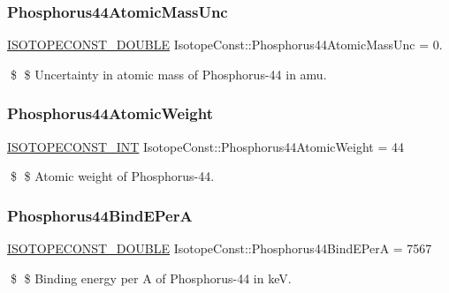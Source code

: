 \subsubsection{\texorpdfstring{Phosphorus44\+Atomic\+Mass\+Unc}{Phosphorus44AtomicMassUnc}}
{\footnotesize\ttfamily \mbox{\hyperlink{group___isotope_const-_macros_ga8f45a7272ce02c0b4c65c44636ed719a}{I\+S\+O\+T\+O\+P\+E\+C\+O\+N\+S\+T\+\_\+\+D\+O\+U\+B\+LE}} Isotope\+Const\+::\+Phosphorus44\+Atomic\+Mass\+Unc = 0.}

\$ \$ Uncertainty in atomic mass of Phosphorus-\/44 in amu. \mbox{\label{group___isotope_const-_phosphorus-_p44_ga813cde5b85bcb0d060cfa6fc65786286}} 
\subsubsection{\texorpdfstring{Phosphorus44\+Atomic\+Weight}{Phosphorus44AtomicWeight}}
{\footnotesize\ttfamily \mbox{\hyperlink{group___isotope_const-_macros_ga5f18360b3e99483a35c32d789e62621c}{I\+S\+O\+T\+O\+P\+E\+C\+O\+N\+S\+T\+\_\+\+I\+NT}} Isotope\+Const\+::\+Phosphorus44\+Atomic\+Weight = 44}

\$ \$ Atomic weight of Phosphorus-\/44. \mbox{\label{group___isotope_const-_phosphorus-_p44_gaeffa4be53d8e2e99e318824c5b758484}} 
\subsubsection{\texorpdfstring{Phosphorus44\+Bind\+E\+PerA}{Phosphorus44BindEPerA}}
{\footnotesize\ttfamily \mbox{\hyperlink{group___isotope_const-_macros_ga8f45a7272ce02c0b4c65c44636ed719a}{I\+S\+O\+T\+O\+P\+E\+C\+O\+N\+S\+T\+\_\+\+D\+O\+U\+B\+LE}} Isotope\+Const\+::\+Phosphorus44\+Bind\+E\+PerA = 7567}

\$ \$ Binding energy per A of Phosphorus-\/44 in keV. \mbox{\label{group___isotope_const-_phosphorus-_p44_ga043e942236f28695e3198418fd73cbc2}} 
